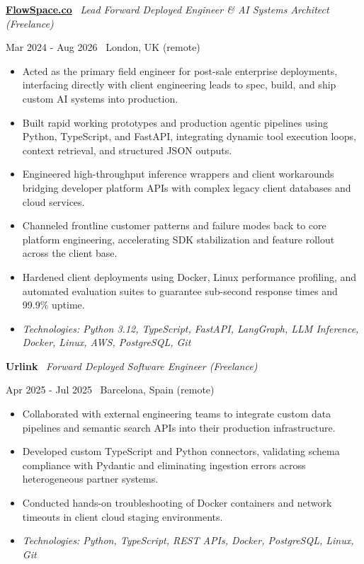 \documentclass[a4paper,10pt]{article}
\newcommand{\role}[4]{%
  \vspace{2pt}\noindent
  \begin{minipage}[t]{0.70\textwidth}\raggedright\textbf{#1} \textbullet\ \textit{#3}\end{minipage}%
  \hfill
  \begin{minipage}[t]{0.28\textwidth}\raggedleft\footnotesize\color{gray}#2 \textbullet\ #4\end{minipage}%
  \vspace{1pt}%
}
\begin{document}
\role{\href{https://flowspace.co}{FlowSpace.co}}{Mar 2024 - Aug 2026}{Lead Forward Deployed Engineer \& AI Systems Architect (Freelance)}{London, UK (remote)}
\begin{itemize}
  \item Acted as the primary field engineer for post-sale enterprise deployments, interfacing directly with client engineering leads to spec, build, and ship custom AI systems into production.
  \item Built rapid working prototypes and production agentic pipelines using Python, TypeScript, and FastAPI, integrating dynamic tool execution loops, context retrieval, and structured JSON outputs.
  \item Engineered high-throughput inference wrappers and client workarounds bridging developer platform APIs with complex legacy client databases and cloud services.
  \item Channeled frontline customer patterns and failure modes back to core platform engineering, accelerating SDK stabilization and feature rollout across the client base.
  \item Hardened client deployments using Docker, Linux performance profiling, and automated evaluation suites to guarantee sub-second response times and 99.9\% uptime.
  \item \textit{Technologies: Python 3.12, TypeScript, FastAPI, LangGraph, LLM Inference, Docker, Linux, AWS, PostgreSQL, Git}
\end{itemize}

\role{Urlink}{Apr 2025 - Jul 2025}{Forward Deployed Software Engineer (Freelance)}{Barcelona, Spain (remote)}
\begin{itemize}
  \item Collaborated with external engineering teams to integrate custom data pipelines and semantic search APIs into their production infrastructure.
  \item Developed custom TypeScript and Python connectors, validating schema compliance with Pydantic and eliminating ingestion errors across heterogeneous partner systems.
  \item Conducted hands-on troubleshooting of Docker containers and network timeouts in client cloud staging environments.
  \item \textit{Technologies: Python, TypeScript, REST APIs, Docker, PostgreSQL, Linux, Git}
\end{itemize}
\end{document}
